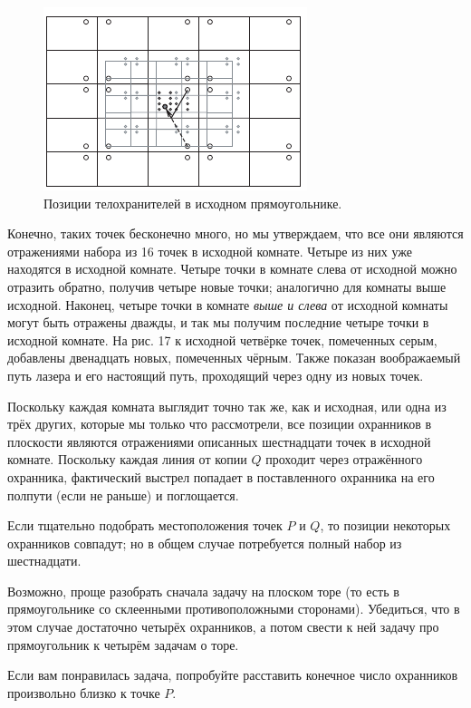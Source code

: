 \begin{figure}[b!]
\centering
\includegraphics[scale=1]{pics/room3}
\caption{Позиции телохранителей в исходном прямоугольнике.}
\label{pic:room3}
\end{figure}

Конечно, таких точек бесконечно много, но мы утверждаем, что все они являются отражениями набора из 16 точек в исходной комнате.
Четыре из них уже находятся в исходной комнате.
Четыре точки в комнате слева от исходной можно отразить обратно, получив четыре новые точки; аналогично для комнаты выше исходной.
Наконец, четыре точки в комнате \emph{выше и слева} от исходной комнаты могут быть отражены дважды, и так мы получим последние четыре точки в исходной комнате.
На рис. 17 к исходной четвёрке точек, помеченных серым, добавлены двенадцать новых, помеченных чёрным.
Также показан воображаемый путь лазера и его настоящий путь, проходящий через одну из новых точек.

Поскольку каждая комната выглядит точно так же, как и исходная, или одна из трёх других, которые мы только что рассмотрели, все позиции охранников в плоскости являются отражениями описанных шестнадцати точек в исходной комнате.
Поскольку каждая линия от копии $Q$ проходит через отражённого охранника, фактический выстрел попадает в поставленного охранника на его полпути (если не раньше) и поглощается.

Если тщательно подобрать местоположения точек $P$ и $Q$, то позиции некоторых охранников совпадут;
но в общем случае потребуется полный набор из шестнадцати.


\begin{addedbytheeditors}
Возможно, проще разобрать сначала задачу на плоском торе (то есть в прямоугольнике со склеенными противоположными сторонами).
Убедиться, что в этом случае достаточно четырёх охранников, а потом свести  к ней задачу про прямоугольник к четырём задачам о торе.

Если вам понравилась задача, попробуйте расставить конечное число охранников произвольно близко к точке $P$.\pr
\end{addedbytheeditors}



